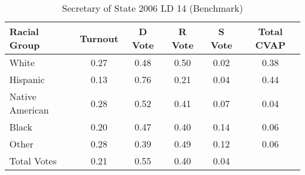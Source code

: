 \begin{table}[htb]
\begin{center}
\caption{Secretary of State 2006 LD 14 (Benchmark)}
\label{sos06_cvap_ld_14_benchmark}
\begin{tabular}{lccccc}
  \hline
Racial Group & Turnout & D Vote & R Vote & S Vote & Total CVAP \\ 
  \hline
White & 0.27 & 0.48 & 0.50 & 0.02 & 0.38 \\ 
  Hispanic & 0.13 & 0.76 & 0.21 & 0.04 & 0.44 \\ 
  Native American & 0.28 & 0.52 & 0.41 & 0.07 & 0.04 \\ 
  Black & 0.20 & 0.47 & 0.40 & 0.14 & 0.06 \\ 
  Other & 0.28 & 0.39 & 0.49 & 0.12 & 0.06 \\ 
  Total Votes & 0.21 & 0.55 & 0.40 & 0.04 &  \\ 
   \hline
\end{tabular}
\end{center}
\end{table}
